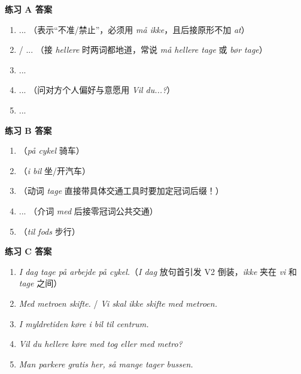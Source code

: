 \begin{answerbox}
\textbf{练习 A 答案}
\begin{enumerate}
  \item {} ... （表示“不准/禁止”，必须用 \textit{må ikke}，且后接原形不加 \textit{at}）
  \item {} /  ... （接 \textit{hellere} 时两词都地道，常说 \textit{må hellere tage} 或 \textit{bør tage}）
  \item {} ... 
  \item {} ... （问对方个人偏好与意愿用 \textit{Vil du...?}）
  \item {} ... 
\end{enumerate}

\textbf{练习 B 答案}
\begin{enumerate}
  \item {}（\textit{på cykel} 骑车）
  \item {}（\textit{i bil} 坐/开汽车）
  \item {}（动词 \textit{tage} 直接带具体交通工具时要加定冠词后缀！）
  \item {} ... （介词 \textit{med} 后接零冠词公共交通）
  \item {}（\textit{til fods} 步行）
\end{enumerate}

\textbf{练习 C 答案}
\begin{enumerate}
  \item \textit{I dag  tage på arbejde på cykel.}（\textit{I dag} 放句首引发 V2 倒装，\textit{ikke} 夹在 \textit{vi} 和 \textit{tage} 之间）
  \item \textit{Med metroen  skifte.} / \textit{Vi skal ikke skifte med metroen.}
  \item \textit{I myldretiden  køre i bil til centrum.}
  \item \textit{Vil du hellere køre med tog eller med metro?}
  \item \textit{Man  parkere gratis her, så mange tager bussen.}
\end{enumerate}


\end{answerbox}
